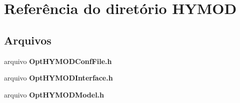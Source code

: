 \section{Referência do diretório H\+Y\+M\+OD}
\label{dir_1bca3cdd2215fea212fd6508e172e9d0}
\subsection*{Arquivos}
\begin{DoxyCompactItemize}
\item 
arquivo {\bf Opt\+H\+Y\+M\+O\+D\+Conf\+File.\+h}
\item 
arquivo {\bf Opt\+H\+Y\+M\+O\+D\+Interface.\+h}
\item 
arquivo {\bf Opt\+H\+Y\+M\+O\+D\+Model.\+h}
\end{DoxyCompactItemize}
